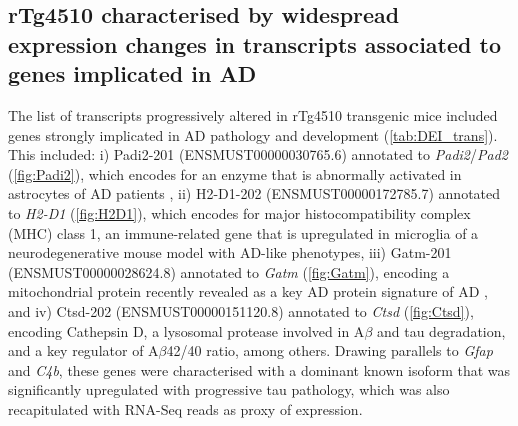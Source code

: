 \clearpage
\subsection{rTg4510 characterised by widespread expression changes in transcripts associated to genes implicated in AD}

The list of transcripts progressively altered in rTg4510 transgenic mice included genes strongly implicated in AD pathology and development (\cref{tab:DEI_trans}). This included: i) Padi2-201 (ENSMUST00000030765.6) annotated to \textit{Padi2}/\textit{Pad2} (\cref{fig:Padi2}), which encodes for an enzyme that is abnormally activated in astrocytes of AD patients \cite{A2005}, ii) H2-D1-202 (ENSMUST00000172785.7) annotated to \textit{H2-D1} (\cref{fig:H2D1}), which encodes for major histocompatibility complex (MHC) class 1, an immune-related gene that is upregulated in microglia of a neurodegenerative mouse model with AD-like phenotypes\cite{Mathys2017}, iii) Gatm-201 (ENSMUST00000028624.8) annotated to \textit{Gatm} (\cref{fig:Gatm}), encoding a mitochondrial protein recently revealed as a key AD protein signature of AD \cite{Wang2020}, and iv) Ctsd-202 (ENSMUST00000151120.8) annotated to \textit{Ctsd} (\cref{fig:Ctsd}), encoding Cathepsin D, a lysosomal protease involved in A$\beta$ \cite{JR1996} and tau \cite{A1997} degradation, and a key regulator of A$\beta$42/40 ratio\cite{Suire2020}, among others. Drawing parallels to \textit{Gfap} and \textit{C4b}, these genes were characterised with a dominant known isoform that was significantly upregulated with progressive tau pathology, which was also recapitulated with RNA-Seq reads as proxy of expression. 


